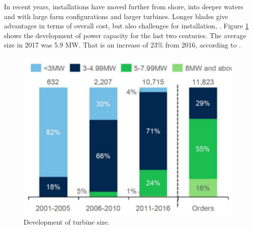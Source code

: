 \noindent In recent years, installations have moved further from shore, into deeper waters and with large farm configurations and larger turbines.  Longer blades give advantages in terms of overall cost, but also challenges for installation, \cite{Gao2018}.  Figure \ref{fig:diameter} shows the development of power capacity for the last two centuries. The average size in 2017 was 5.9 MW. That is an increase of 23\% from 2016, according to \cite{we2018}.

\begin{figure}[H]
\centering
\includegraphics[scale=0.7]{figures/diameter}
\caption[$\; \:$Development of turbine size]{Development of turbine size. \cite{Deigen2018}}
 \label{fig:diameter}
\end{figure}


